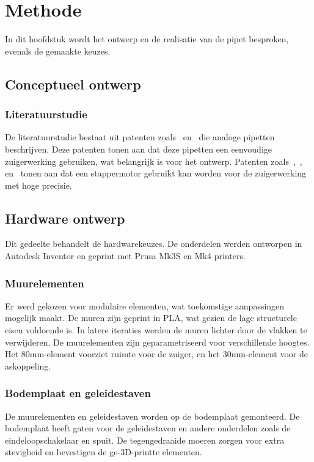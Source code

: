 \chapter{Methode}
In dit hoofdstuk wordt het ontwerp en de realisatie van de pipet besproken, evenals de gemaakte keuzes.

\section{Conceptueel ontwerp}
\subsection{Literatuurstudie}
De literatuurstudie bestaat uit patenten zoals\ \cite{RN16} en\ \cite{RN17} die analoge pipetten beschrijven. Deze patenten tonen aan dat deze pipetten een eenvoudige zuigerwerking gebruiken, wat belangrijk is voor het ontwerp. Patenten zoals\ \cite{RN35},\ \cite{RN36}, en\ \cite{RN38} tonen aan dat een stappermotor gebruikt kan worden voor de zuigerwerking met hoge precisie.

\section{Hardware ontwerp}
Dit gedeelte behandelt de hardwarekeuzes. De onderdelen werden ontworpen in Autodesk Inventor en geprint met Prusa Mk3S en Mk4 printers.

\subsection{Muurelementen}
Er werd gekozen voor modulaire elementen, wat toekomstige aanpassingen mogelijk maakt. De muren zijn geprint in PLA, wat gezien de lage structurele eisen voldoende is. In latere iteraties werden de muren lichter door de vlakken te verwijderen. De muurelementen zijn geparametriseerd voor verschillende hoogtes. Het 80mm-element voorziet ruimte voor de zuiger, en het 30mm-element voor de askoppeling.

\subsection{Bodemplaat en geleidestaven}
De muurelementen en geleidestaven worden op de bodemplaat gemonteerd. De bodemplaat heeft gaten voor de geleidestaven en andere onderdelen zoals de eindeloopschakelaar en spuit. De tegengedraaide moeren zorgen voor extra stevigheid en bevestigen de ge-3D-printte elementen.

